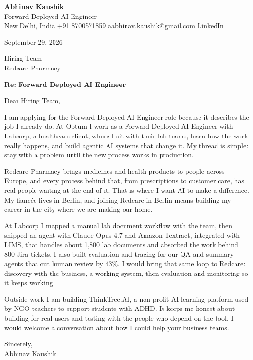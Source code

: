 \documentclass[11pt,a4paper]{article}
\begin{document}
{\Large\bfseries Abhinav Kaushik}\\
Forward Deployed AI Engineer\\
New Delhi, India \textbar{} +91 8700571859 \textbar{} \href{mailto:aabhinav.kaushik@gmail.com}{aabhinav.kaushik@gmail.com} \textbar{} \href{https://www.linkedin.com/in/abhinav-kaushik10/}{LinkedIn}  

September 29, 2026

Hiring Team\\
Redcare Pharmacy

\textbf{Re: Forward Deployed AI Engineer}

Dear Hiring Team,

I am applying for the Forward Deployed AI Engineer role because it describes the job I already do. At Optum I work as a Forward Deployed AI Engineer with Labcorp, a healthcare client, where I sit with their lab teams, learn how the work really happens, and build agentic AI systems that change it. My thread is simple: stay with a problem until the new process works in production.

Redcare Pharmacy brings medicines and health products to people across Europe, and every process behind that, from prescriptions to customer care, has real people waiting at the end of it. That is where I want AI to make a difference. My fiancée lives in Berlin, and joining Redcare in Berlin means building my career in the city where we are making our home.

At Labcorp I mapped a manual lab document workflow with the team, then shipped an agent with Claude Opus 4.7 and Amazon Textract, integrated with LIMS, that handles about 1,800 lab documents and absorbed the work behind 800 Jira tickets. I also built evaluation and tracing for our QA and summary agents that cut human review by 43\%. I would bring that same loop to Redcare: discovery with the business, a working system, then evaluation and monitoring so it keeps working.

Outside work I am building ThinkTree.AI, a non-profit AI learning platform used by NGO teachers to support students with ADHD. It keeps me honest about building for real users and testing with the people who depend on the tool. I would welcome a conversation about how I could help your business teams.

Sincerely,\\[4pt]
Abhinav Kaushik
\end{document}
